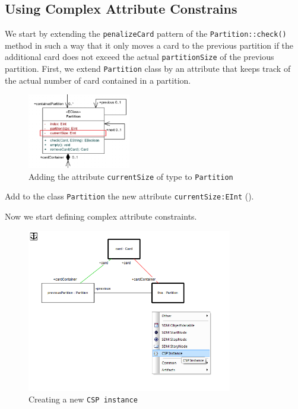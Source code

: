 \subsection{Using Complex Attribute Constrains}     
We start by extending the \texttt{penalizeCard} pattern of the \texttt{Partition::check()} method in such a way that it only moves a card to the previous partition if the additional card does not exceed the actual \texttt{partitionSize} of the previous partition.
First, we extend \texttt{Partition} class by an attribute that keeps track of the actual number of card contained in a partition.
\begin{figure}[htbp]
\begin{center}
  \includegraphics[width=0.4\textwidth]{../../org.moflon.doc.handbook.03_storyDiagrams/13_complexAttributeConstraints/visCACImages/ea_CAC_newAtributes}
  \caption{Adding the attribute \texttt{currentSize} of type  to \texttt{Partition}}  
  \label{ea_CAC_newAtributes}
\end{center}
\end{figure}
%
\begin{stepbystep}    
\item Add to the class \texttt{Partition} the new attribute \texttt{currentSize:EInt} ().
\end{stepbystep} 
%
Now we start defining complex attribute constraints.
\begin{figure}[htbp]
\begin{center}
  \includegraphics[width=0.8\textwidth]{../../org.moflon.doc.handbook.03_storyDiagrams/13_complexAttributeConstraints/visCACImages/ea_CAC_NewCSP}
  \caption{Creating a new \texttt{CSP instance}}  
  \label{ea:CAC_NewCSP}
\end{center}
\end{figure}
